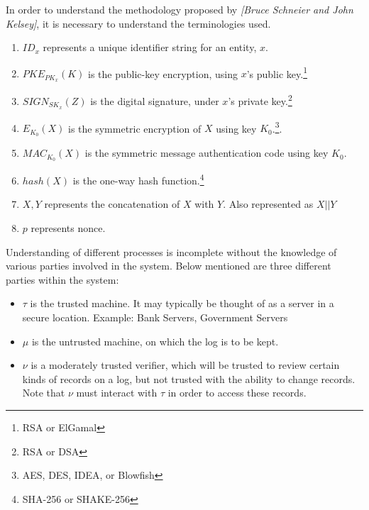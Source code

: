 \documentclass[12pt, letter]{article}
\newcommand\paperAuthors[2]{[#1 and #2]}
\newcommand\makePaperAuthors{\paperAuthors{Bruce Schneier}{John Kelsey}}
\begin{document}
In order to understand the methodology proposed by \textit{\makePaperAuthors}, it is necessary to understand the terminologies used.
\renewcommand{\labelenumi}{(\roman{enumi})}
\begin{enumerate}
    \item $ID_x$ represents a unique identifier string for an entity, $x$. 
    
    \item $PKE_{PK_x} (K)$ is the public-key encryption, using $x$’s public key.\footnote{RSA or ElGamal}

    \item $SIGN_{SK_x}(Z)$ is the digital signature, under $x$’s private key.\footnote{RSA or DSA}

    \item $E_{K_0}(X)$ is the symmetric encryption of $X$ using key $K_0$.\footnote{AES, DES, IDEA, or Blowfish}. 

    \item $MAC_{K_0}(X)$ is the symmetric message authentication code using key $K_0$. 

    \item $hash(X)$ is the one-way hash function.\footnote{SHA-256 or SHAKE-256}

    \item $X, Y$ represents the concatenation of $X$ with $Y$. Also represented as $X || Y$

    \item $p$ represents nonce.
\end{enumerate}

Understanding of different processes is incomplete without the knowledge of various parties involved in the system. Below mentioned are three different parties within the system:

\begin{itemize}
    \item $\tau$ is the trusted machine. It may typically be thought of as a server in a secure location. Example: Bank Servers, Government Servers
    
    \item $\mu$ is the untrusted machine, on which the log is to be kept.
    
    \item $\nu$ is a moderately trusted verifier, which will be trusted to review certain kinds of records on a log, but not trusted with the ability to change records. Note that $\nu$ must interact with $\tau$ in order to access these records. 
\end{itemize}
\end{document}
